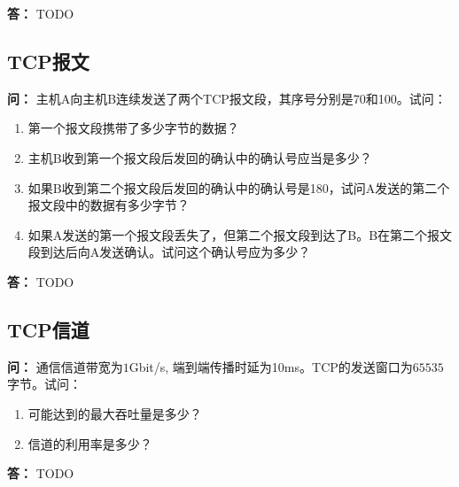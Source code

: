 \documentclass[12pt,hyperref,a4paper,UTF8]{ctexart}
\begin{document}
\textbf{答：}
TODO

\subsection{TCP报文}
\textbf{问：}
主机A向主机B连续发送了两个TCP报文段，其序号分别是70和100。试问：
\begin{enumerate}[label=\Roman*),leftmargin=2.2\parindent]
    \item 第一个报文段携带了多少字节的数据？
    \item 主机B收到第一个报文段后发回的确认中的确认号应当是多少？
    \item 如果B收到第二个报文段后发回的确认中的确认号是180，试问A发送的第二个报文段中的数据有多少字节？
    \item 如果A发送的第一个报文段丢失了，但第二个报文段到达了B。B在第二个报文段到达后向A发送确认。试问这个确认号应为多少？
\end{enumerate}

\textbf{答：}
TODO

\subsection{TCP信道}
\textbf{问：}
通信信道带宽为$1$Gbit/s, 端到端传播时延为10ms。TCP的发送窗口为$65535$字节。试问：
\begin{enumerate}[label=\Roman*),leftmargin=2.2\parindent]
    \item 可能达到的最大吞吐量是多少？
    \item 信道的利用率是多少？
\end{enumerate}

\textbf{答：}
TODO
\end{document}
